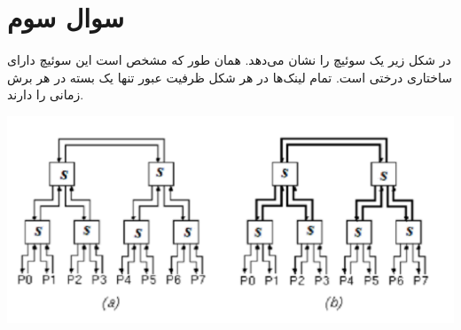 \section{سوال سوم}

در شکل زیر یک سوئیچ  را نشان می‌دهد. همان طور که مشخص است این سوئیچ دارای ساختاری درختی است. تمام لینک‌ها در هر شکل  ظرفیت عبور تنها یک بسته در هر برش زمانی را دارند.


\begin{center}
	\includegraphics*[width=1\linewidth]{pics/img1.png}
	\label{سوئیچ سوال سوم}
\end{center}


